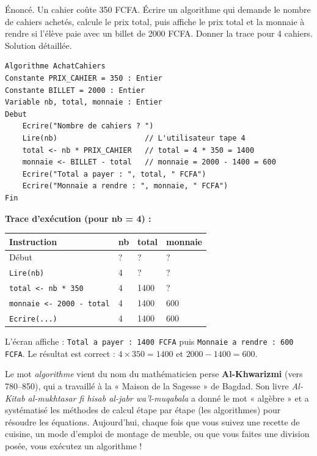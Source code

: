 \documentclass[11pt]{article}
\begin{document}
\begin{exoresolu}
Énoncé. Un cahier coûte 350 FCFA. Écrire un algorithme qui demande le nombre de cahiers achetés, calcule le prix total, puis affiche le prix total et la monnaie à rendre si l'élève paie avec un billet de 2000 FCFA. Donner la trace pour 4 cahiers.
\tcblower
Solution détaillée.
\begin{lstlisting}
Algorithme AchatCahiers
Constante PRIX_CAHIER = 350 : Entier
Constante BILLET = 2000 : Entier
Variable nb, total, monnaie : Entier
Debut
    Ecrire("Nombre de cahiers ? ")
    Lire(nb)                    // L'utilisateur tape 4
    total <- nb * PRIX_CAHIER   // total = 4 * 350 = 1400
    monnaie <- BILLET - total   // monnaie = 2000 - 1400 = 600
    Ecrire("Total a payer : ", total, " FCFA")
    Ecrire("Monnaie a rendre : ", monnaie, " FCFA")
Fin
\end{lstlisting}
\textbf{Trace d'exécution (pour nb = 4) :}
\begin{center}
\begin{tabularx}{0.9\linewidth}{|l|X|X|X|}\hline
\rowcolor{popblueL} \textbf{Instruction} & \textbf{nb} & \textbf{total} & \textbf{monnaie} \\ \hline
Début & ? & ? & ? \\ \hline
\texttt{Lire(nb)} & 4 & ? & ? \\ \hline
\texttt{total <- nb * 350} & 4 & 1400 & ? \\ \hline
\texttt{monnaie <- 2000 - total} & 4 & 1400 & 600 \\ \hline
\texttt{Ecrire(...)} & 4 & 1400 & 600 \\ \hline
\end{tabularx}
\end{center}
L'écran affiche : \texttt{Total a payer : 1400 FCFA} puis \texttt{Monnaie a rendre : 600 FCFA}. Le résultat est correct : $4 \times 350 = 1400$ et $2000 - 1400 = 600$.
\end{exoresolu}

\begin{savaistu}
Le mot \emph{algorithme} vient du nom du mathématicien perse \textbf{Al-Khwarizmi} (vers 780--850), qui a travaillé à la « Maison de la Sagesse » de Bagdad. Son livre \emph{Al-Kitab al-mukhtasar fi hisab al-jabr wa'l-muqabala} a donné le mot « algèbre » et a systématisé les méthodes de calcul étape par étape (les algorithmes) pour résoudre les équations. Aujourd'hui, chaque fois que vous suivez une recette de cuisine, un mode d'emploi de montage de meuble, ou que vous faites une division posée, vous exécutez un algorithme !
\end{savaistu}
\end{document}
